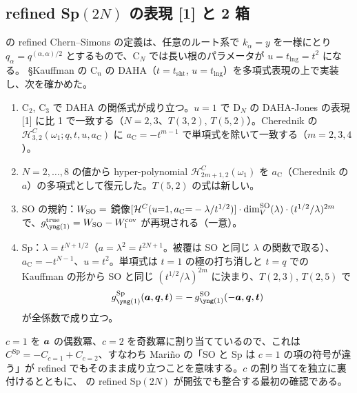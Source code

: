 \subsection{refined Sp$(2N)$ の表現 [1] と 2 箱}\label{sec:sp}
\cite{AM22} の refined Chern--Simons の定義は、任意のルート系で $k_\alpha = y$ を一様にとり $q_\alpha = q^{(\alpha,\alpha)/2}$ とするもので、C$_N$ では長い根のパラメータが $u = t_{\mathrm{lng}} = t^2$ になる。
\cite{Cherednik11} §Kauffman の C$_n$ の DAHA（$t = t_{\mathrm{sht}}$, $u = t_{\mathrm{lng}}$）を多項式表現の上で実装し、次を確かめた。
\begin{compresult}
\begin{enumerate}
\item C$_2$, C$_3$ で DAHA の関係式が成り立つ。$u = 1$ で D$_N$ の DAHA-Jones の表現 [1] に比 1 で一致する（$N = 2, 3$、$T(3,2)$, $T(5,2)$）。Cherednik の $\mathcal{H}^C_{3,2}(\omega_1; q, t, u, a_{\mathrm{C}})$ に $a_{\mathrm{C}} = -t^{m-1}$ で単項式を除いて一致する（$m = 2, 3, 4$）。
\item $N = 2, \dots, 8$ の値から hyper-polynomial $\mathcal{H}^C_{2m+1,2}(\omega_1)$ を $a_{\mathrm{C}}$（Cherednik の $a$）の多項式として復元した。$T(5,2)$ の式は新しい。
\item SO の規約：$W_{\mathrm{SO}} = $ 鏡像$[\mathcal{H}^C(u{=}1, a_{\mathrm{C}}{=}-\lambda/t^{1/2})]\cdot\dim_V^{\mathrm{SO}}(\lambda)\cdot(t^{1/2}/\lambda)^{2m}$ で、$g^{\mathrm{true}}_{\yone} = W_{\SO} - W^{\cov}_1$ が再現される（一意）。
\item Sp：$\lambda = t^{N+1/2}$（$a = \lambda^2 = t^{2N+1}$。被覆は SO と同じ $\lambda$ の関数で取る）、$a_{\mathrm{C}} = -t^{N-1}$、$u = t^2$。単項式は $t = 1$ の極の打ち消しと $t = q$ での Kauffman の形から SO と同じ $(t^{1/2}/\lambda)^{2m}$ に決まり、$T(2,3)$, $T(2,5)$ で
\[
g^{\mathrm{Sp}}_{\yone}(\ba, \bq, \bt) = -\,g^{\SO}_{\yone}(-\ba, \bq, \bt)
\]
が全係数で成り立つ。
\end{enumerate}
\end{compresult}
$c = 1$ を $\bm{a}$ の偶数冪、$c = 2$ を奇数冪に割り当てているので、これは $C^{\mathrm{Sp}} = -C_{c=1} + C_{c=2}$、すなわち Mariño の「SO と Sp は $c = 1$ の項の符号が違う」が refined でもそのまま成り立つことを意味する。$c$ の割り当てを独立に裏付けるとともに、\cite{AM22} の refined Sp$(2N)$ が開弦でも整合する最初の確認である。

